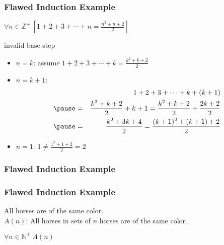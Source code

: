 \documentclass[dvipsnames]{beamer}
\begin{document}
\begin{frame}
  \frametitle{Flawed Induction Example}

  \begin{theorem}
    $\forall n \in \mathbb{Z}^+~[1+2+3+\cdots+n=\frac{n^2+n+2}{2}]$
  \end{theorem}

  \pause
  \begin{block}{invalid base step}
    \begin{itemize}
      \item $n=k$: assume $1+2+3+\cdots+k=\frac{k^2+k+2}{2}$

      \pause
      \item $n=k+1$:
      \begin{eqnarray*}
        &   & 1+2+3+\cdots+k+(k+1)\\\pause
        & = & \frac{k^2+k+2}{2}+k+1
          =   \frac{k^2+k+2}{2}+\frac{2k+2}{2}\\\pause
        & = & \frac{k^2+3k+4}{2}
          =   \frac{(k+1)^2+(k+1)+2}{2}
      \end{eqnarray*}

      \pause
      \item $n=1$: $1 \neq \frac{1^2+1+2}{2}=2$
    \end{itemize}
  \end{block}
\end{frame}

\begin{frame}
  \frametitle{Flawed Induction Example}

  \begin{center}
  \end{center}
\end{frame}

\begin{frame}
  \frametitle{Flawed Induction Example}

  \begin{theorem}
    All horses are of the same color.\\
    \pause
    \bigskip
    $A(n)$: All horses in sets of $n$ horses are of the same color.

    \medskip
    $\forall n \in \mathbb{N^+}~A(n)$
  \end{theorem}
\end{frame}
\end{document}
